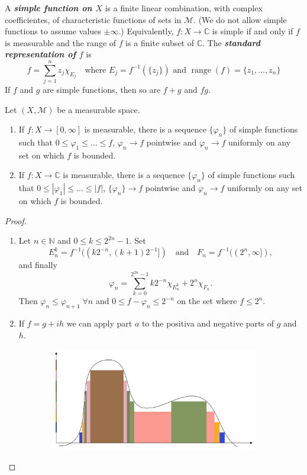 \documentclass{article}
\theoremstyle{definition}
\numberwithin{equation}{section}
\newcommand{\N}{\mathbb{N}}
\newcommand{\C}{\mathbb{C}}
\begin{document}
\begin{itemize}
		A \textbf{\textit{simple function on $X$}} is a finite linear combination, with complex coefficientes, of characteristic functions of sets in $\mathcal{M}$. (We do not allow simple functions to assume values $\pm\infty$.) Equivalently, $f:X\to\C$ is simple if and only if $f$ is measurable and the range of $f$ is a finite subset of $\C$. The \textbf{\textit{standard representation of $f$}} is
		\[f=\sum_{j=1}^nz_j\chi_{E_j}\quad\text{where }E_j=f^{-1}(\{z_j\})\text{ and }\operatorname{range}(f)=\{z_1,\ldots,z_n\}\]
		If $f$ and $g$ are simple functions, then so are $f+g$ and $fg$.
		\begin{thm}
			Let $(X,\mathcal{M})$ be a measurable space.
			\begin{enumerate}
				\item If $f:X\to[0,\infty]$ is measurable, there is a sequence $\{\varphi_n\}$ of simple functions such that $0\leq\varphi_1\leq\ldots\leq f$, $\varphi_n\to f$ pointwise and $\varphi_n\to f$ uniformly on any set on which $f$ is bounded.
				\item If $f:X\to\C$ is measurable, there is a sequence $\{\varphi_n\}$ of simple functions such that $0\leq|\varphi_1|\leq\ldots\leq|f|$, $\{\varphi_n\}\to f$ pointwise and $\varphi_n\to f$ uniformly on any set on which $f$ is bounded.
			\end{enumerate}
		\end{thm}
		\begin{proof}\leavevmode
			\begin{enumerate}
				\item Let $n\in\N$ and $0\leq k\leq 2^{2n}-1$. Set
				\[E^k_n=f^{-1}((k2^{-n},(k+1)2^{-1}])\quad\text{and}\quad F_n=f^{-1}((2^n,\infty]),\]
				and finally
				\[\varphi_n=\sum_{k=0}^{2^{2n}-1}k2^{-n}\chi_{E^k_n}+2^n\chi_{F_n}.\]
				Then $\varphi_n\leq\varphi_{n+1}\;\forall n$ and $0\leq f-\varphi_n\leq 2^{-n}$ on the set where $f\leq 2^n$.
				\item If $f=g+ih$ we can apply part $a$ to the positiva and negative parts of $g$ and $h$.
			\end{enumerate}
			\begin{figure}[H]
				\begin{center}
					\begin{subfigure}{\linewidth}
						\centering
						\includegraphics[width=1\linewidth]{fig1}

\end{subfigure}
\end{center}
\end{figure}
\end{proof}
\end{itemize}
\end{document}
